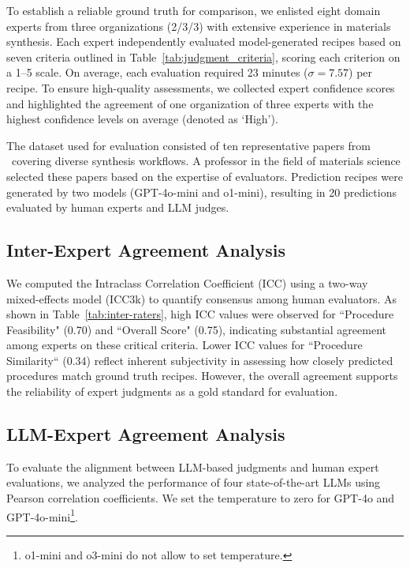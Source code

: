 To establish a reliable ground truth for comparison, we enlisted eight domain experts from three organizations (2/3/3) with extensive experience in materials synthesis. Each expert independently evaluated model-generated recipes based on seven criteria outlined in Table~\ref{tab:judgment_criteria}, scoring each criterion on a 1–5 scale. On average, each evaluation required 23 minutes (\(\sigma=7.57\)) per recipe. To ensure high-quality assessments, we collected expert confidence scores and highlighted the agreement of one organization of three experts with the highest confidence levels on average (denoted as `High').

The dataset used for evaluation consisted of ten representative papers from \oursdatashort~covering diverse synthesis workflows. A professor in the field of materials science selected these papers based on the expertise of evaluators. Prediction recipes were generated by two models (GPT-4o-mini and o1-mini), resulting in 20 predictions evaluated by human experts and LLM judges.

\subsection{Inter-Expert Agreement Analysis}
\label{subsec:inter_rater_analysis}


We computed the Intraclass Correlation Coefficient (ICC) using a two-way mixed-effects model (ICC3k) to quantify consensus among human evaluators. As shown in Table~\ref{tab:inter-raters}, high ICC values were observed for ``Procedure Feasibility" (0.70) and ``Overall Score" (0.75), indicating substantial agreement among experts on these critical criteria. Lower ICC values for ``Procedure Similarity`` (0.34) reflect inherent subjectivity in assessing how closely predicted procedures match ground truth recipes. However, the overall agreement supports the reliability of expert judgments as a gold standard for evaluation.

\subsection{LLM-Expert Agreement Analysis}
\label{subsec:llm_expert_analysis}


To evaluate the alignment between LLM-based judgments and human expert evaluations, we analyzed the performance of four state-of-the-art LLMs using Pearson correlation coefficients. 
We set the temperature to zero for GPT-4o and GPT-4o-mini\footnote{o1-mini and o3-mini do not allow to set temperature.}.

